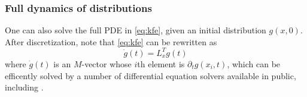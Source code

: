 \documentclass[11pt]{article}
\theoremstyle{definition}
\begin{document}
\subsubsection{Full dynamics of distributions}
One can also solve the full PDE in \eqref{eq:kfe}, given an initial distribution $g(x, 0)$. After discretization, note that \eqref{eq:kfe} can be rewritten as
\begin{equation}\label{eq:kfe-discretized}
\dot{g}(t) = L^T_x g(t)
\end{equation}
where $\dot{g}(t)$ is an $M$-vector whose $i$th element is $\partial_{t} g(x_i, t)$, which can be efficently solved by a number of differential equation solvers available in public, including \cite{rackauckas17}.

\newpage

\end{document}
